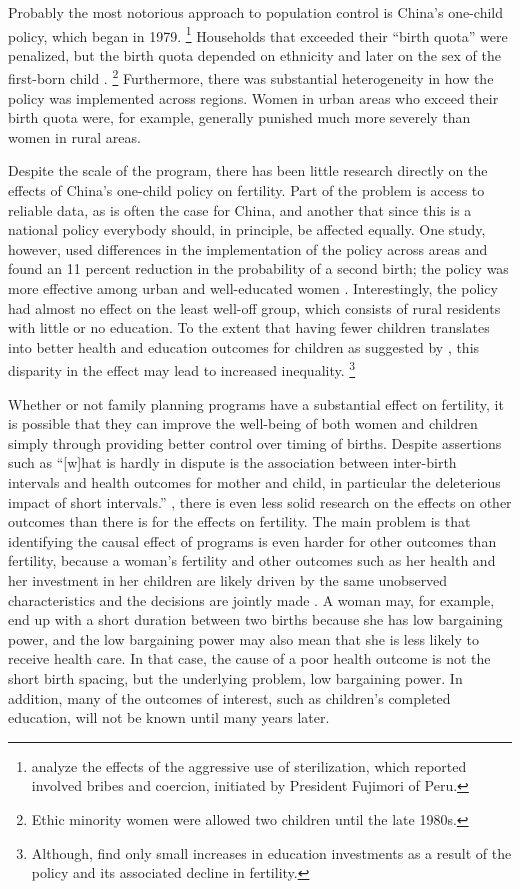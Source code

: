 \documentclass[letterpaper,12pt]{article}
\begin{document}
Probably the most notorious approach to population control is China's
one-child policy, which began in 1979.%
\footnote{
\citet{Byker2012} analyze the effects of the aggressive use of
sterilization, which reported involved bribes and coercion, initiated 
by President Fujimori of Peru.
}
Households that exceeded their ``birth quota'' were penalized, but the
birth quota depended on ethnicity and later on the sex of the first-born
child \citep{Li2005}.%
\footnote{
Ethic minority women were allowed two children until the late 1980s.}
Furthermore, there was substantial heterogeneity in how the policy was
implemented across regions.
Women in urban areas who exceed their birth quota were, for example,
generally punished much more severely than women in rural areas.

Despite the scale of the program, there has been little research
directly on the effects of China's one-child policy on fertility.
Part of the problem is access to reliable data, as is often the
case for China, and another that since this is a national policy
everybody should, in principle, be affected equally.
One study, however, used differences in the implementation of the
policy across areas and found an 11 percent reduction in the probability 
of a second birth; the policy was more effective among urban and 
well-educated women \citep{Li2005}.
Interestingly, the policy had almost no eﬀect on the least well-oﬀ
group, which consists of rural residents with little or no education.
To the extent that having fewer children translates into better health
and education outcomes for children as suggested by \citet{becker73},
this disparity in the effect may lead to increased inequality.%
\footnote{
Although, \citet{Rosenzweig2009} find only small increases in education
investments as a result of the policy and its associated decline in
fertility.}


Whether or not family planning programs have a substantial effect on
fertility, it is possible that they can improve the well-being of both
women and children simply through providing better control over timing
of births.
Despite assertions such as ``[w]hat is hardly in dispute is the association 
between inter-birth intervals and health outcomes for mother and child, 
in particular the deleterious impact of short intervals.'' 
\citep[p. 175]{Casterline2016}, there is even less solid research 
on the effects on other outcomes than there is for the effects 
on fertility.
The main problem is that identifying the causal effect of programs is
even harder for other outcomes than fertility, because a woman's
fertility and other outcomes such as her health and her investment 
in her children are likely driven by the same unobserved characteristics 
and the decisions are jointly made \citep{Schultz2005}.
A woman may, for example, end up with a short duration between two
births because she has low bargaining power, and the low bargaining
power may also mean that she is less likely to receive health care.
In that case, the cause of a poor health outcome is not the
short birth spacing, but the underlying problem, low bargaining power.
In addition, many of the outcomes of interest, such as children's
completed education, will not be known until many years later.
\end{document}
